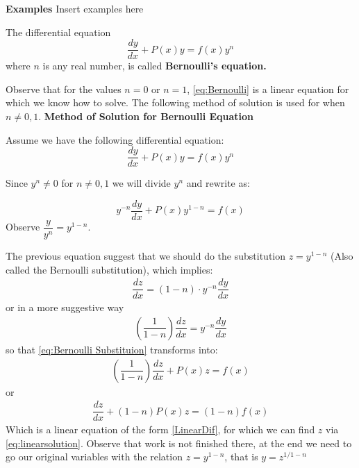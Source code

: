 \textbf{Examples}
Insert examples here

\begin{define}
The differential equation
\begin{equation}\label{eq:Bernoulli}
\dfrac{dy}{dx} + P(x)y = f(x)y^n
\end{equation}
where $n$ is any real number, is called \textbf{Bernoulli's equation.}
\end{define}
Observe that for the values $n=0$  or $n=1$, \eqref{eq:Bernoulli} is a linear equation for which we know how to solve. The following method of solution is used for when $ n \neq 0,1$.
\textbf{Method of Solution for Bernoulli Equation}

Assume we have the following differential equation:
\begin{equation*}
\dfrac{dy}{dx} + P(x)y = f(x)y^n
\end{equation*}

Since $y^n \neq 0$ for $n \neq 0,1$ we will divide $y^{n}$ and rewrite as:

\begin{equation} \label{eq:Bernoulli Substituion}
y^{-n}\dfrac{dy}{dx} + P(x)y^{1-n} = f(x)
\end{equation}
Observe $ \dfrac{y}{y^{n}} = y^{1-n} $.

The previous equation suggest that we should do the substitution $ z = y^{1-n} $ (Also called the Bernoulli substitution), which implies:
\begin{align*}
\dfrac{dz}{dx} = (1-n) \cdot y^{-n} \dfrac{dy}{dx}
\end{align*}
or in a more suggestive way
\begin{align*}
\left( \dfrac{1}{1-n} \right)  \dfrac{dz}{dx} =   y^{-n} \dfrac{dy}{dx}
\end{align*}
so that \eqref{eq:Bernoulli Substituion} transforms into:
\begin{align*}
\left( \dfrac{1}{1-n} \right)  \dfrac{dz}{dx} + P(x)z = f(x)
\end{align*}
or 
\begin{align*}
\dfrac{dz}{dx} + \left( 1-n \right) P(x) z = \left( 1-n \right) f(x)
\end{align*}
Which is a linear equation of the form \eqref{LinearDif}, for which we can find $z$ via \eqref{eq:linearsolution}. 
Observe that work is not finished there, at the end we need to go our original variables with the relation $ z = y^{1-n} $, that is $ y = z^{1/1-n} $
